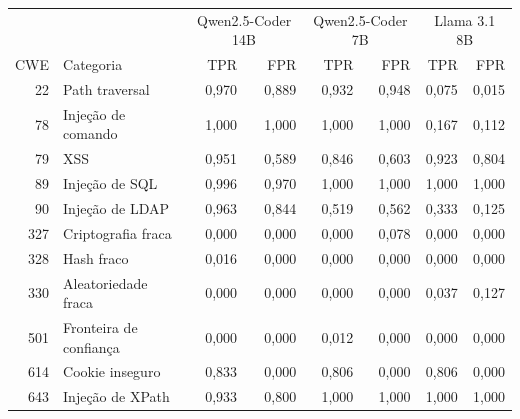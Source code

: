 \begin{tabular}{rlrrrrrr}
\hline
 &  & \multicolumn{2}{c}{Qwen2.5-Coder 14B} & \multicolumn{2}{c}{Qwen2.5-Coder 7B} & \multicolumn{2}{c}{Llama 3.1 8B} \\
CWE & Categoria & TPR & FPR & TPR & FPR & TPR & FPR \\
\hline
22 & Path traversal & 0,970 & 0,889 & 0,932 & 0,948 & 0,075 & 0,015 \\
78 & Injeção de comando & 1,000 & 1,000 & 1,000 & 1,000 & 0,167 & 0,112 \\
79 & XSS & 0,951 & 0,589 & 0,846 & 0,603 & 0,923 & 0,804 \\
89 & Injeção de SQL & 0,996 & 0,970 & 1,000 & 1,000 & 1,000 & 1,000 \\
90 & Injeção de LDAP & 0,963 & 0,844 & 0,519 & 0,562 & 0,333 & 0,125 \\
327 & Criptografia fraca & 0,000 & 0,000 & 0,000 & 0,078 & 0,000 & 0,000 \\
328 & Hash fraco & 0,016 & 0,000 & 0,000 & 0,000 & 0,000 & 0,000 \\
330 & Aleatoriedade fraca & 0,000 & 0,000 & 0,000 & 0,000 & 0,037 & 0,127 \\
501 & Fronteira de confiança & 0,000 & 0,000 & 0,012 & 0,000 & 0,000 & 0,000 \\
614 & Cookie inseguro & 0,833 & 0,000 & 0,806 & 0,000 & 0,806 & 0,000 \\
643 & Injeção de XPath & 0,933 & 0,800 & 1,000 & 1,000 & 1,000 & 1,000 \\
\hline
\end{tabular}
